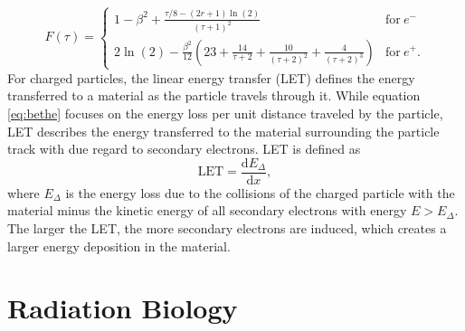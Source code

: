 \begin{equation}
F(\tau) = \begin{cases}
1 - \beta^2 + \frac{\tau/8 - (2r+1)\ln(2)}{(\tau + 1)^2} & \mathrm{for}~e^-\,\\
2\ln(2) - \frac{\beta^2}{12}\left(23 + \frac{14}{\tau + 2} + \frac{10}{(\tau + 2)^2} + \frac{4}{(\tau + 2)^3}\right)& \mathrm{for }~e^+.
\end{cases}
\end{equation}
For charged particles, the linear energy transfer (LET) defines the energy transferred to a material as the particle travels through it. While equation \ref{eq:bethe} focuses on the energy loss per unit distance traveled by the particle, LET describes the energy transferred to the material surrounding the particle track with due regard to secondary electrons. LET is defined as
\begin{equation}
\mathrm{LET} = \frac{\mathrm{d}E_\Delta}{\mathrm{d}x},
\end{equation}
where $E_\Delta$ is the energy loss due to the collisions of the charged particle with the material minus the kinetic energy of all secondary electrons with energy $E>E_\Delta$. The larger the LET, the more secondary electrons are induced, which creates a larger energy deposition in the material.
\section{Radiation Biology}
